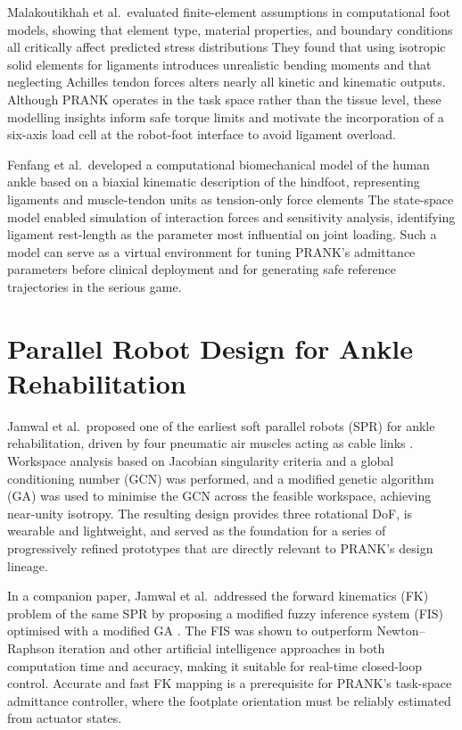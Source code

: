 Malakoutikhah et al.\ evaluated finite-element assumptions in computational foot models, showing that element type, material properties, and boundary conditions all critically affect predicted stress distributions %
They found that using isotropic solid elements for ligaments introduces unrealistic bending moments and that neglecting Achilles tendon forces alters nearly all kinetic and kinematic outputs.
Although PRANK operates in the task space rather than the tissue level, these modelling insights inform safe torque limits and motivate the incorporation of a six-axis load cell at the robot-foot interface to avoid ligament overload.

Fenfang et al.\ developed a computational biomechanical model of the human ankle based on a biaxial kinematic description of the hindfoot, representing ligaments and muscle-tendon units as tension-only force elements %
The state-space model enabled simulation of interaction forces and sensitivity analysis, identifying ligament rest-length as the parameter most influential on joint loading.
Such a model can serve as a virtual environment for tuning PRANK's admittance parameters before clinical deployment and for generating safe reference trajectories in the serious game.

\section{Parallel Robot Design for Ankle Rehabilitation}

Jamwal et al.\ proposed one of the earliest soft parallel robots (SPR) for ankle rehabilitation, driven by four pneumatic air muscles acting as cable links \cite{Jamwal2009}.
Workspace analysis based on Jacobian singularity criteria and a global conditioning number (GCN) was performed, and a modified genetic algorithm (GA) was used to minimise the GCN across the feasible workspace, achieving near-unity isotropy.
The resulting design provides three rotational DoF, is wearable and lightweight, and served as the foundation for a series of progressively refined prototypes that are directly relevant to PRANK's design lineage.

In a companion paper, Jamwal et al.\ addressed the forward kinematics (FK) problem of the same SPR by proposing a modified fuzzy inference system (FIS) optimised with a modified GA \cite{Jamwal2009}.
The FIS was shown to outperform Newton--Raphson iteration and other artificial intelligence approaches in both computation time and accuracy, making it suitable for real-time closed-loop control.
Accurate and fast FK mapping is a prerequisite for PRANK's task-space admittance controller, where the footplate orientation must be reliably estimated from actuator states.

